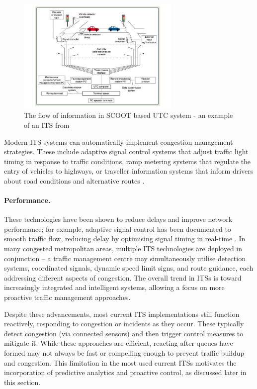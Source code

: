 \begin{figure}[!ht]
  \centering
  \includegraphics[width=0.7\textwidth]{images/background/ITS.pdf}
  \caption[The flow of information in SCOOT based UTC system - an example of an ITS]{The flow of information in SCOOT based UTC system - an example of an ITS from~\cite{noauthor_urban_nodate}}
  \label{fig:ITS}
\end{figure} 

Modern ITS systems can automatically implement congestion management strategies. These include adaptive signal control systems that adjust traffic light timing in response to traffic conditions, ramp metering systems that regulate the entry of vehicles to highways, or traveller information systems that inform drivers about road conditions and alternative routes \cite{noauthor_what_nodate}.

\paragraph{Performance.} These technologies have been shown to reduce delays and improve network performance; for example, adaptive signal control has been documented to smooth traffic flow, reducing delay by optimising signal timing in real-time \cite{zhao_overview_2012}. In many congested metropolitan areas, multiple ITS technologies are deployed in conjunction – a traffic management centre may simultaneously utilise detection systems, coordinated signals, dynamic speed limit signs, and route guidance, each addressing different aspects of congestion. The overall trend in ITSs is toward increasingly integrated and intelligent systems, allowing a focus on more proactive traffic management approaches.

Despite these advancements, most current ITS implementations still function reactively, responding to congestion or incidents as they occur. These typically detect congestion (via connected sensors) and then trigger control measures to mitigate it. While these approaches are efficient, reacting after queues have formed may not always be fast or compelling enough to prevent traffic buildup and congestion. This limitation in the most used current ITSs motivates the incorporation of predictive analytics and proactive control, as discussed later in this section.


